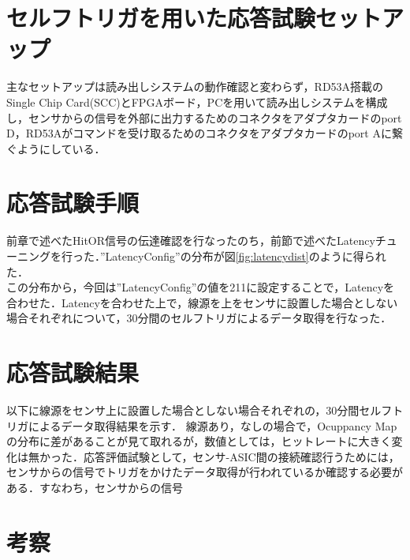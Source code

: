 \section{セルフトリガを用いた応答試験セットアップ}
主なセットアップは読み出しシステムの動作確認と変わらず，RD53A搭載のSingle Chip Card(SCC)とFPGAボード，PCを用いて読み出しシステムを構成し，センサからの信号を外部に出力するためのコネクタをアダプタカードのport D，RD53Aがコマンドを受け取るためのコネクタをアダプタカードのport Aに繋ぐようにしている．


\section{応答試験手順}
前章で述べたHitOR信号の伝達確認を行なったのち，前節で述べたLatencyチューニングを行った．''LatencyConfig''の分布が図\ref{fig:latencydist}のように得られた．\\
この分布から，今回は''LatencyConfig''の値を211に設定することで，Latencyを合わせた．Latencyを合わせた上で，線源を上をセンサに設置した場合としない場合それぞれについて，30分間のセルフトリガによるデータ取得を行なった．

\section{応答試験結果}
以下に線源をセンサ上に設置した場合としない場合それぞれの，30分間セルフトリガによるデータ取得結果を示す．
線源あり，なしの場合で，Ocuppancy Mapの分布に差があることが見て取れるが，数値としては，ヒットレートに大きく変化は無かった．応答評価試験として，センサ-ASIC間の接続確認行うためには，センサからの信号でトリガをかけたデータ取得が行われているか確認する必要がある．すなわち，センサからの信号

\section{考察}

